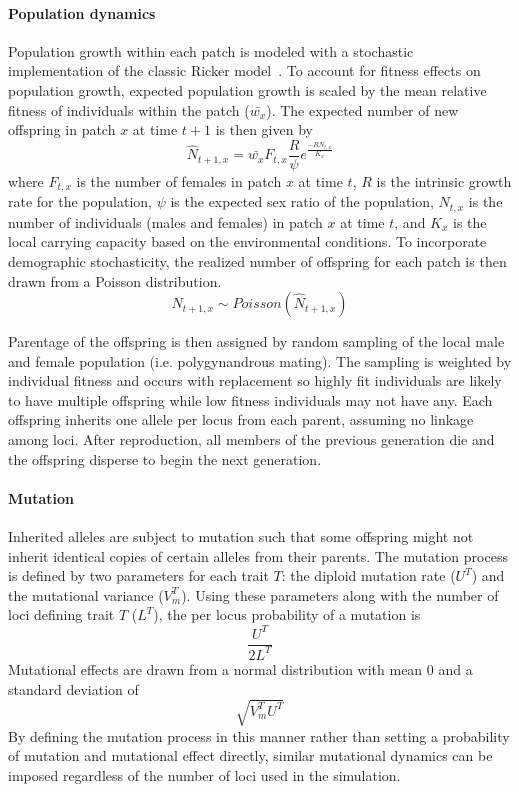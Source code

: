 \documentclass[11pt, oneside]{article}
\begin{document}
\paragraph{Population dynamics}
Population growth within each patch is modeled with a stochastic implementation of the classic Ricker model~\citep{ricker1954stock, melbourne2008extinction}. To account for fitness effects on population growth, expected population growth is scaled by the mean relative fitness of individuals within the patch ($\bar{w_{x}}$). The expected number of new offspring in patch $x$ at time $t+1$ is then given by
\begin{equation}
\hat{N}_{t+1,x}=\bar{w_{x}}F_{t,x}\frac{R}{\psi}e^{\frac{-RN_{t,x}}{K_{x}}}
\end{equation}
where $F_{t,x}$ is the number of females in patch $x$ at time $t$, $R$ is the intrinsic growth rate for the population, $\psi$ is the expected sex ratio of the population, $N_{t,x}$ is the number of individuals (males and females) in patch $x$ at time $t$, and $K_{x}$ is the local carrying capacity based on the environmental conditions. To incorporate demographic stochasticity, the realized number of offspring for each patch is then drawn from a Poisson distribution.
\begin{equation}
N_{t+1,x}\sim Poisson(\hat{N}_{t+1,x})
\end{equation}

Parentage of the offspring is then assigned by random sampling of the local male and female population (i.e. polygynandrous mating). The sampling is weighted by individual fitness and occurs with replacement so highly fit individuals are likely to have multiple offspring while low fitness individuals may not have any. Each offspring inherits one allele per locus from each parent, assuming no linkage among loci. After reproduction, all members of the previous generation die and the offspring disperse to begin the next generation.

\paragraph{Mutation}
Inherited alleles are subject to mutation such that some offspring might not inherit identical copies of certain alleles from their parents. The mutation process is defined by two parameters for each trait $T$: the diploid mutation rate ($U^{T}$) and the mutational variance ($V_{m}^{T}$). Using these parameters along with the number of loci defining trait $T$ ($L^{T}$), the per locus probability of a mutation is
\begin{equation}
\frac{U^{T}}{2L^{T}}
\end{equation}
Mutational effects are drawn from a normal distribution with mean $0$ and a standard deviation of
\begin{equation}
\sqrt{V_{m}^{T}U^{T}}
\end{equation}
By defining the mutation process in this manner rather than setting a probability of mutation and mutational effect directly, similar mutational dynamics can be imposed regardless of the number of loci used in the simulation.
\end{document}
